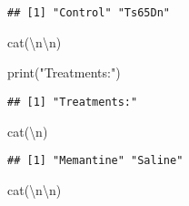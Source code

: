 \documentclass[
]{article}
\newenvironment{Shaded}{\begin{snugshade}}{\end{snugshade}}
\newcommand{\FunctionTok}[1]{\textcolor[rgb]{0.00,0.00,0.00}{#1}}
\newcommand{\NormalTok}[1]{#1}
\newcommand{\SpecialCharTok}[1]{\textcolor[rgb]{0.00,0.00,0.00}{#1}}
\newcommand{\StringTok}[1]{\textcolor[rgb]{0.31,0.60,0.02}{#1}}
\begin{document}
\begin{Shaded}
\end{Shaded}

\begin{verbatim}
## [1] "Control" "Ts65Dn"
\end{verbatim}

\begin{Shaded}
\begin{Highlighting}[]
\FunctionTok{cat}\NormalTok{(}\StringTok{\textquotesingle{}}\SpecialCharTok{\textbackslash{}n\textbackslash{}n}\StringTok{\textquotesingle{}}\NormalTok{)}
\end{Highlighting}
\end{Shaded}

\begin{Shaded}
\begin{Highlighting}[]
\FunctionTok{print}\NormalTok{(}\StringTok{"Treatments:"}\NormalTok{)}
\end{Highlighting}
\end{Shaded}

\begin{verbatim}
## [1] "Treatments:"
\end{verbatim}

\begin{Shaded}
\begin{Highlighting}[]
\FunctionTok{cat}\NormalTok{(}\StringTok{\textquotesingle{}}\SpecialCharTok{\textbackslash{}n}\StringTok{\textquotesingle{}}\NormalTok{)}
\end{Highlighting}
\end{Shaded}

\begin{Shaded}
\end{Shaded}

\begin{verbatim}
## [1] "Memantine" "Saline"
\end{verbatim}

\begin{Shaded}
\begin{Highlighting}[]
\FunctionTok{cat}\NormalTok{(}\StringTok{\textquotesingle{}}\SpecialCharTok{\textbackslash{}n\textbackslash{}n}\StringTok{\textquotesingle{}}\NormalTok{)}
\end{Highlighting}
\end{Shaded}
\end{document}
